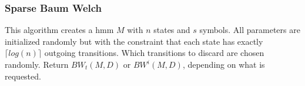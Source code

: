 \subsubsection{Sparse Baum Welch}
This algorithm creates a \gls{hmm} $M$ with $n$ states and $s$ symbols.
All parameters are initialized randomly but with the constraint that each state has exactly $\lceil log(n) \rceil$ outgoing transitions.
Which transitions to discard are chosen randomly.
Return $BW_t(M, D)$ or $BW^i(M, D)$, depending on what is requested.